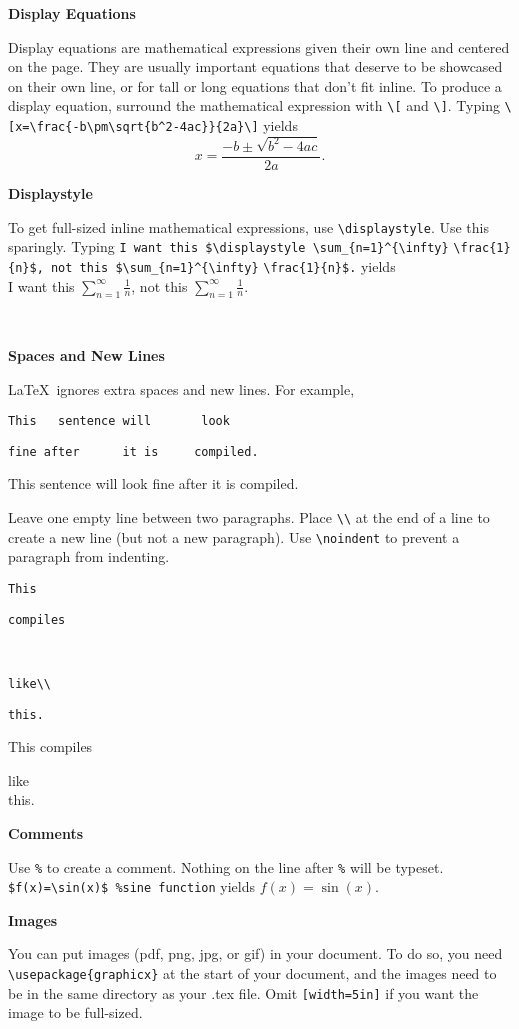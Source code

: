 \documentclass[10pt,landscape]{article}
\newcommand{\ColorSection}[1]{\par\vspace{1.5ex}\noindent\textcolor{sectioncolor}{\Large\bfseries #1}\par\vspace{0.75ex}}
\newcommand{\ColorSubsection}[1]{\par\vspace{1ex}\noindent\textcolor{subsectioncolor}{\normalsize\bfseries #1}\par\vspace{0.5ex}}
\begin{document}
\begin{multicols}{3}
\ColorSubsection{Display Equations}
Display equations are mathematical expressions given their own line and centered on the page. They are usually important equations that deserve to be showcased on their own line, or for tall or long equations that don't fit inline. To produce a display equation, surround the mathematical expression with \verb!\[! and \verb!\]!. Typing \verb!\[x=\frac{-b\pm\sqrt{b^2-4ac}}{2a}\]! yields \[x=\frac{-b\pm\sqrt{b^2-4ac}}{2a}.\]
 
\ColorSubsection{Displaystyle} 
To get full-sized inline mathematical expressions, use  \verb!\displaystyle!. Use this sparingly. Typing \verb!I want this $\displaystyle \sum_{n=1}^{\infty}! \verb!\frac{1}{n}$, not this $\sum_{n=1}^{\infty}! \verb!\frac{1}{n}$.! yields\\ I want  this $\displaystyle \sum_{n=1}^{\infty}\frac{1}{n}$, not this $\sum_{n=1}^{\infty}\frac{1}{n}.$

\vfill
~
\columnbreak



\ColorSection{Spaces and New Lines}

\LaTeX\ ignores extra spaces and new lines. For example, 

\verb!This   sentence will       look!

\verb!fine after      it is     compiled.!

This   sentence will       look
fine after      it is     compiled.


Leave one empty line between two paragraphs. Place \verb!\\! at the end of a line to create a new line (but not a new paragraph). Use  \verb!\noindent! to prevent a paragraph from indenting.

\verb!This!

\verb!compiles!

~

\verb!like\\!

\verb!this.!

This
compiles 

like\\
this.



\ColorSection{Comments}

Use \verb!%! to create a comment. Nothing on the line after \verb!%! will be typeset. \verb!$f(x)=\sin(x)$ %sine function! yields $f(x)=\sin(x)$.

\ColorSection{Images}

You can put images (pdf, png, jpg, or gif) in your document. To do so, you need \verb!\usepackage{graphicx}! at the start of your document, and the images need to be in the same directory as your .tex file. Omit   \verb![width=5in]! if you want the image to be full-sized.


\end{multicols}
\end{document}
